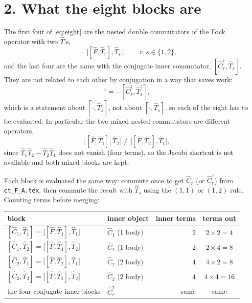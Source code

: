 \documentclass[11pt]{article}
\begin{document}
\section*{2. What the eight blocks are}

The first four of \eqref{eq:eight} are the nested double commutators of the
Fock operator with two $\hat T$'s,
\begin{equation}
  [\hat C_r,\hat T_s]=\bigl[[\hat F,\hat T_r],\hat T_s\bigr],
  \qquad r,s\in\{1,2\},
  \label{eq:nested}
\end{equation}
and the last four are the same with the conjugate inner commutator,
$[\hat C_r^\dagger,\hat T_s]$. They are not related to each other by
conjugation in a way that saves work:
\begin{equation}
  [\hat C_r,\hat T_s]^\dagger=-[\hat C_r^\dagger,\hat T_s^\dagger],
  \label{eq:adjoint}
\end{equation}
which is a statement about $[\cdot,\hat T_s^\dagger]$, not about
$[\cdot,\hat T_s]$, so each of the eight has to be evaluated. In particular the
two mixed nested commutators are different operators,
\begin{equation}
  \bigl[[\hat F,\hat T_1],\hat T_2\bigr]\neq
  \bigl[[\hat F,\hat T_2],\hat T_1\bigr],
\end{equation}
since $\hat T_1\hat T_2-\hat T_2\hat T_1$ does not vanish (four terms), so the
Jacobi shortcut is not available and both mixed blocks are kept.

Each block is evaluated the same way: commute once to get $\hat C_r$ (or
$\hat C_r^\dagger$) from \texttt{ct\_F\_A.tex}, then commute the result with
$\hat T_s$ using the $(1,1)$ or $(1,2)$ rule. Counting terms before merging:
\begin{center}
\footnotesize
\begin{tabular}{@{}llrc@{}}
\toprule
block & inner object & inner terms & terms out \\
\midrule
$[\hat C_1,\hat T_1]=\bigl[[\hat F,\hat T_1],\hat T_1\bigr]$
  & $\hat C_1$ (1 body) & 2 & $2\times2=4$ \\
$[\hat C_1,\hat T_2]=\bigl[[\hat F,\hat T_1],\hat T_2\bigr]$
  & $\hat C_1$ (1 body) & 2 & $2\times4=8$ \\
$[\hat C_2,\hat T_1]=\bigl[[\hat F,\hat T_2],\hat T_1\bigr]$
  & $\hat C_2$ (2 body) & 4 & $4\times2=8$ \\
$[\hat C_2,\hat T_2]=\bigl[[\hat F,\hat T_2],\hat T_2\bigr]$
  & $\hat C_2$ (2 body) & 4 & $4\times4=16$ \\
the four conjugate-inner blocks & $\hat C_r^\dagger$ & same & same \\
\bottomrule
\end{tabular}
\end{center}
\end{document}
